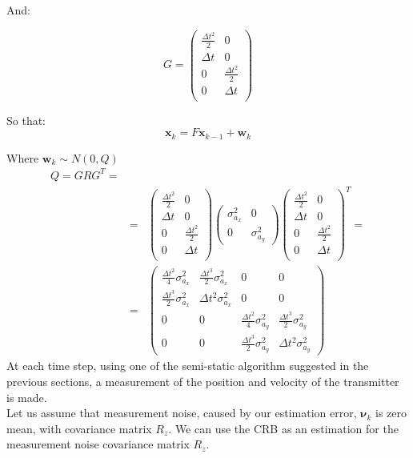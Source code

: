 \documentclass[10pt,a4paper]{report}
\begin{document}
And:

\begin{equation}
G = 
\begin{pmatrix} 
\frac{\Delta t^2}{2} & 0 \\
\Delta t & 0\\
0 & \frac{\Delta t^2}{2}\\
0& \Delta t\\
\end{pmatrix}
\end{equation}

So that:
\begin{equation}
\mathbf{x}_{k} = F \mathbf{x}_{k-1}+\mathbf{w}_{k}
\end{equation}

Where $\mathbf{w}_{k} \sim N(0,Q)$
\begin{eqnarray}
Q = GRG^T = \\
&=& \begin{pmatrix} 
\frac{\Delta t^2}{2} & 0 \\
\Delta t & 0\\
0 & \frac{\Delta t^2}{2}\\
0& \Delta t\\
\end{pmatrix} 
\begin{pmatrix} \sigma^2_{a_x} & 0 \\ 0 & \sigma^2_{a_y} \end{pmatrix}
\begin{pmatrix} 
\frac{\Delta t^2}{2} & 0 \\
\Delta t & 0\\
0 & \frac{\Delta t^2}{2}\\
0& \Delta t\\
\end{pmatrix} ^T  = \nonumber \\
&=& 
\begin{pmatrix}
\frac{\Delta t^2}{4}\sigma^2_{a_x} &\frac{\Delta t^3}{2}\sigma^2_{a_x} &0&0\\
\frac{\Delta t^3}{2}\sigma^2_{a_x} & \Delta t^2 \sigma^2_{a_x}&0&0 \\
0&0& \frac{\Delta t^2}{4}\sigma^2_{a_y} &\frac{\Delta t^3}{2}\sigma^2_{a_y}\\
0&0&\frac{\Delta t^3}{2}\sigma^2_{a_y} & \Delta t^2 \sigma^2_{a_y}
\end{pmatrix} \nonumber
\end{eqnarray}
At each time step, using one of the semi-static algorithm suggested in the previous sections, a
measurement of the position and velocity of the transmitter is made.
\\
Let us assume that measurement noise, caused by our estimation error, $\mathbf{\nu}_{k}$ is
zero mean, with covariance matrix $R_z$. We can use the CRB as an estimation for the measurement noise covariance matrix $R_z$.\\
\end{document}

